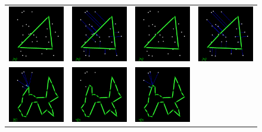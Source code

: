 \documentclass{article}
\begin{document}
\begin{figure}
\begin{center}
\begin{tabular}{cccc}
\includegraphics[width=29mm]{images/progress-00.png} &
\includegraphics[width=29mm]{images/progress-01.png} &
\includegraphics[width=29mm]{images/progress-02.png} &
\includegraphics[width=29mm]{images/progress-03.png} \\
\includegraphics[width=29mm]{images/progress-04.png} &
\includegraphics[width=29mm]{images/progress-05.png} &
\includegraphics[width=29mm]{images/progress-06.png} &

\end{tabular}
\end{center}
\end{figure}
\end{document}
